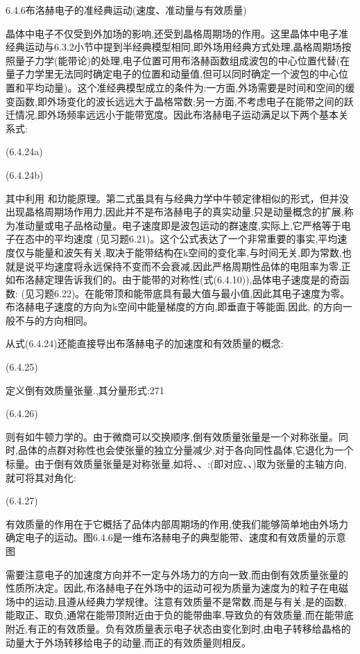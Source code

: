 6.4.6布洛赫电子的准经典运动(速度、准动量与有效质量)

晶体中电子不仅受到外加场的影响,还受到晶格周期场的作用。这里晶体中电子准经典运动与6.3.2小节中提到半经典模型相同,即外场用经典方式处理,晶格周期场按照量子力学(能带论)的处理,电子位置可用布洛赫函数组成波包的中心位置代替(在量子力学里无法同时确定电子的位置和动量值,但可以同时确定一个波包的中心位置和平均动量)。这个准经典模型成立的条件为:一方面,外场需要是时间和空间的缓变函数,即外场变化的波长远远大于晶格常数;另一方面,不考虑电子在能带之间的跃迁情况,即外场频率远远小于能带宽度。因此布洛赫电子运动满足以下两个基本关系式:

 	(6.4.24a)

	 (6.4.24b)

	其中利用 和玏能原理。第二式虽具有与经典力学中牛顿定律相似的形式，但并没出现晶格周期场作用力,因此并不是布洛赫电子的真实动量,只是动量概念的扩展,称为准动量或电子品格动量。电子速度即是波包运动的群速度,实际上,它严格等于电子在态中的平均速度 (见习题6.21)。这个公式表达了一个非常重要的事实,平均速度仅与能量和波矢有关,取决于能带结构在k空间的变化率,与时间无关,即为常数,也就是说平均速度将永远保持不变而不会衰减,因此严格周期性品体的电阻率为零,正如布洛赫定理告诉我们的。由于能带的对称性(式(6.4.10)),品体电子速度是的奇函数:  (见习题6.22)。在能带顶和能带底具有最大值与最小值,因此其电子速度为零。布洛赫电子速度的方向为k空间中能量梯度的方向,即垂直于等能面,因此, 的方向一般不与的方向相同。

从式(6.4.24)还能直接导出布落赫电子的加速度和有效质量的概念:

 	(6.4.25)

定义倒有效质量张量.,其分量形式:271

 (6.4.26)

则有如牛顿力学的。由于微商可以交换顺序,倒有效质量张量是一个对称张量。同时,品体的点群对称性也会使张量的独立分量减少,对于各向同性晶体,它退化为一个标量。由于倒有效质量张量是对称张量,如将、、:(即对应、、)取为张量的主轴方向,就可将其对角化:

 	(6.4.27)

有效质量的作用在于它概括了品体内部周期场的作用,使我们能够简单地由外场力确定电子的运动。图6.4.6是一维布洛赫电子的典型能带、速度和有效质量的示意图



需要注意电子的加速度方向并不一定与外场力的方向一致,而由倒有效质量张量的性质所决定。因此,布洛赫电子在外场中的运动可视为质量为速度为的粒子在电磁场中的运动,且遵从经典力学规律。注意有效质量不是常数,而是与有关,是的函数,能取正、取负,通常在能带顶附近由于负的能带曲率,导致负的有效质量,而在能带底附近,有正的有效质量。负有效质量表示电子状态由变化到时,由电子转移给晶格的动量大于外场转移给电子的动量,而正的有效质量则相反。

